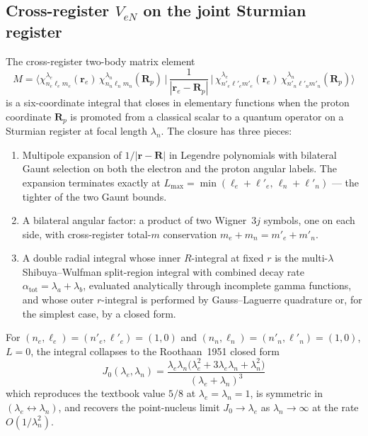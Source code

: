 \documentclass[twocolumn,prc,amsmath,amssymb,superscriptaddress]{revtex4-2}
\begin{document}
\subsection{Cross-register $V_{eN}$ on the joint Sturmian register}
\label{ssec:cross-vne}

The cross-register two-body matrix element
\begin{equation}
  M = \big\langle
    \chi^{\lambda_e}_{n_e \ell_e m_e}(\mathbf{r}_e)\,
    \chi^{\lambda_n}_{n_n \ell_n m_n}(\mathbf{R}_p)
  \,\big|\,
    \frac{1}{|\mathbf{r}_e - \mathbf{R}_p|}
  \,\big|\,
    \chi^{\lambda_e}_{n'_e \ell'_e m'_e}(\mathbf{r}_e)\,
    \chi^{\lambda_n}_{n'_n \ell'_n m'_n}(\mathbf{R}_p)
  \big\rangle
\label{eq:cross-vne}
\end{equation}
is a six-coordinate integral that closes in elementary functions when
the proton coordinate $\mathbf{R}_p$ is promoted from a classical scalar
to a quantum operator on a Sturmian register at focal length $\lambda_n$.
The closure has three pieces:
\begin{enumerate}
  \item Multipole expansion of $1/|\mathbf{r} - \mathbf{R}|$ in
    Legendre polynomials with bilateral Gaunt selection on both the
    electron and the proton angular labels. The expansion terminates
    exactly at $L_{\max} = \min(\ell_e + \ell'_e,\,\ell_n + \ell'_n)$
    --- the tighter of the two Gaunt bounds.
  \item A bilateral angular factor: a product of two Wigner~$3j$ symbols,
    one on each side, with cross-register total-$m$ conservation
    $m_e + m_n = m'_e + m'_n$.
  \item A double radial integral whose inner $R$-integral at fixed $r$
    is the multi-$\lambda$ Shibuya--Wulfman split-region integral with
    combined decay rate $\alpha_{\mathrm{tot}} = \lambda_a + \lambda_b$,
    evaluated analytically through incomplete gamma functions, and
    whose outer $r$-integral is performed by Gauss--Laguerre quadrature
    or, for the simplest case, by a closed form.
\end{enumerate}
For $(n_e, \ell_e) = (n'_e, \ell'_e) = (1,0)$ and
$(n_n, \ell_n) = (n'_n, \ell'_n) = (1,0)$, $L = 0$, the integral
collapses to the Roothaan~1951 closed form
\begin{equation}
  \boxed{\;
    J_0(\lambda_e, \lambda_n)
    = \frac{\lambda_e \lambda_n
      \big(\lambda_e^2 + 3 \lambda_e \lambda_n + \lambda_n^2\big)}
      {(\lambda_e + \lambda_n)^3}
  \;}
\label{eq:roothaan-J0}
\end{equation}
which reproduces the textbook value $5/8$ at
$\lambda_e = \lambda_n = 1$, is symmetric in
$(\lambda_e \leftrightarrow \lambda_n)$, and recovers the point-nucleus
limit $J_0 \to \lambda_e$ as $\lambda_n \to \infty$ at the rate
$O(1/\lambda_n^2)$.
\end{document}
